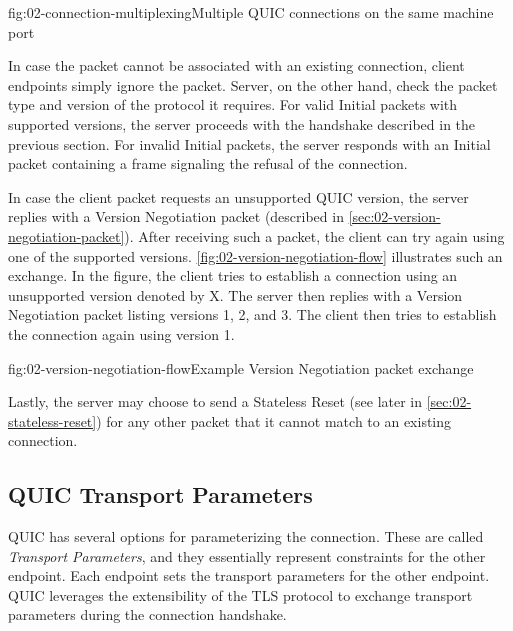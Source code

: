 \begin{myFigure}{fig:02-connection-multiplexing}{Multiple QUIC connections on the same machine port}



\end{myFigure}

In case the packet cannot be associated with an existing connection, client endpoints simply ignore
the packet. Server, on the other hand, check the packet type and version of the protocol it
requires. For valid Initial packets with supported versions, the server proceeds with the handshake
described in the previous section. For invalid Initial packets, the server responds with an Initial
packet containing a \CONNECTIONCLOSE{} frame signaling the refusal of the connection.

In case the client packet requests an unsupported QUIC version, the server replies with a Version
Negotiation packet (described in \autoref{sec:02-version-negotiation-packet}). After receiving such
a packet, the client can try again using one of the supported versions.
\autoref{fig:02-version-negotiation-flow} illustrates such an exchange. In the figure, the client
tries to establish a connection using an unsupported version denoted by X. The server then replies
with a Version Negotiation packet listing versions 1, 2, and 3. The client then tries to establish
the connection again using version 1.

\begin{myFigure}{fig:02-version-negotiation-flow}{Example Version Negotiation packet exchange}

\resizebox{\linewidth}{!}{}

\end{myFigure}

Lastly, the server may choose to send a Stateless Reset (see later in
\autoref{sec:02-stateless-reset}) for any other packet that it cannot match to an existing
connection.

\subsection{QUIC Transport Parameters}\label{sec:02-transport-parameters}

QUIC has several options for parameterizing the connection. These are called \textit{Transport
Parameters}, and they essentially represent constraints for the other endpoint. Each endpoint sets
the transport parameters for the other endpoint. QUIC leverages the extensibility of the TLS
protocol to exchange transport parameters during the connection handshake.

